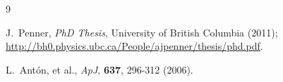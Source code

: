 \documentclass[11pt,preprint]{aastex}
\begin{document}
\begin{thebibliography}{9}

 J.~Penner, \emph{PhD Thesis}, University of British Columbia (2011); 
\url{http://bh0.physics.ubc.ca/People/ajpenner/thesis/phd.pdf}. 

 L.~Ant\'{o}n, et al., \emph{ApJ}, \textbf{637}, 296-312 (2006).

\end{thebibliography}
\end{document}

